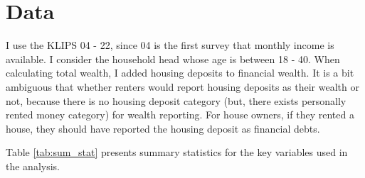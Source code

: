 \documentclass[10pt]{article}
\theoremstyle{definition}
\theoremstyle{remark}
\begin{document}
\section{Data}\label{sec:data}
I use the KLIPS 04 - 22, since 04 is the first survey that monthly income is available. I consider the household head whose age is between 18 - 40. When calculating total wealth, I added housing deposits to financial wealth. It is a bit ambiguous that whether renters would report housing deposits as their wealth or not, because there is no housing deposit category (but, there exists personally rented money category) for wealth reporting. For house owners, if they rented a house, they should have reported the housing deposit as financial debts.

Table \ref{tab:sum_stat} presents summary statistics for the key variables used in the analysis.
\end{document}
